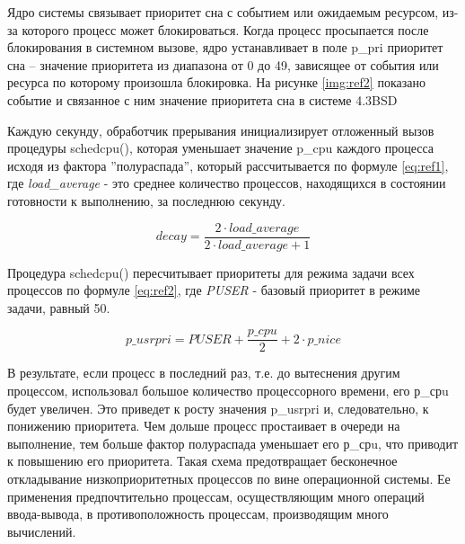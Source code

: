 Ядро системы связывает приоритет сна с событием или ожидаемым ресурсом,
из-за которого процесс может блокироваться. 
Когда процесс просыпается после блокирования в системном вызове,
ядро устанавливает в поле p\_pri приоритет сна – значение приоритета
из диапазона от 0 до 49, зависящее от события или ресурса
по которому произошла блокировка. 
На рисунке \ref{img:ref2} показано 
событие и связанное с ним значение приоритета сна 
в системе 4.3BSD 

\begin{figure}[ht!]
\end{figure}

Каждую секунду, обработчик прерывания 
инициализирует отложенный вызов процедуры
schedcpu(), которая уменьшает значение p\_cpu каждого 
процесса исходя из фактора ''полураспада'', который рассчитывается по формуле \ref{eq:ref1}, где
\textit{load\_average} - это среднее количество процессов, находящихся в состоянии готовности к выполнению, за последнюю секунду.

\begin{equation}
	\label{eq:ref1}
	decay = \frac{2 \cdot load\_average}{2 \cdot load\_average + 1}
\end{equation}

Процедура schedcpu() пересчитывает приоритеты для режима задачи
всех процессов по формуле \ref{eq:ref2}, где \textit{PUSER} - базовый приоритет в режиме задачи, равный 50.

\begin{equation}
	\label{eq:ref2}
	p\_usrpri = PUSER + \frac{p\_cpu}{2} + 2 \cdot p\_nice
\end{equation}

В результате, если процесс в последний раз, т.е. до вытеснения другим
процессом, использовал большое количество процессорного времени, его
р\_срu будет увеличен. Это приведет к росту значения p\_usrpri и,
следовательно, к понижению приоритета. 
Чем дольше процесс простаивает в очереди на выполнение,
тем больше фактор полураспада уменьшает его
р\_срu, что приводит к повышению его приоритета. Такая схема
предотвращает бесконечное откладывание низкоприоритетных процессов
по вине операционной системы.
Ее применения предпочтительно процессам, осуществляющим много
операций ввода-вывода, в противоположность процессам, производящим
много вычислений.

